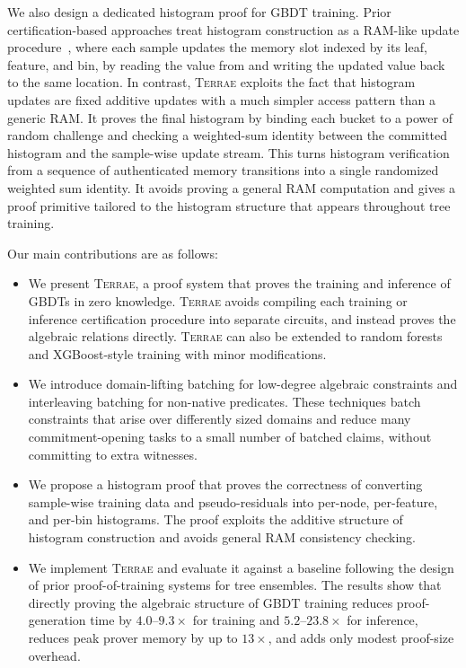 We also design a dedicated histogram proof for GBDT training. Prior
certification-based approaches treat histogram construction as a RAM-like
update procedure~\cite{sparrow24,zkboost26},
where each sample updates the memory slot indexed by its leaf, feature,
and bin, by reading the value from and writing the updated value back to the same location.
In contrast, \textsc{Terrae} exploits the fact that histogram updates
are fixed additive updates with a much simpler access pattern than a generic RAM.
It proves the final histogram by binding each bucket
to a power of random challenge and checking a weighted-sum identity between the committed
histogram and the sample-wise update stream. This turns histogram verification
from a sequence of authenticated memory transitions into a single randomized
weighted sum identity. It avoids proving a general RAM
computation and gives a proof primitive tailored to the histogram structure
that appears throughout tree training.

Our main contributions are as follows:

\begin{itemize}
    \item We present \textsc{Terrae}, a proof system that
    proves the training and inference of GBDTs in zero knowledge.
    \textsc{Terrae} avoids compiling each training or inference
    certification procedure into
    separate circuits, and instead proves the algebraic relations directly.
    \textsc{Terrae} can also be extended to random forests and XGBoost-style training with minor modifications.

    \item We introduce domain-lifting batching for low-degree algebraic
    constraints and interleaving batching for non-native predicates. These techniques
    batch constraints that arise over differently sized domains and reduce many
    commitment-opening tasks to a small number of batched claims, without
    committing to extra witnesses.

    \item We propose a histogram proof that proves the correctness of converting
    sample-wise training data and pseudo-residuals into per-node, per-feature, and
    per-bin histograms. The proof exploits the additive structure of histogram
    construction and avoids general RAM consistency checking.

    \item We implement \textsc{Terrae} and evaluate it against a
    baseline following the design of prior proof-of-training
    systems for tree ensembles. The results show that directly proving the
    algebraic structure of GBDT training reduces proof-generation time by
    $4.0\text{--}9.3\times$ for training and $5.2\text{--}23.8\times$ for
    inference, reduces peak prover memory by up to $13\times$, and adds only
    modest proof-size overhead.
\end{itemize}

